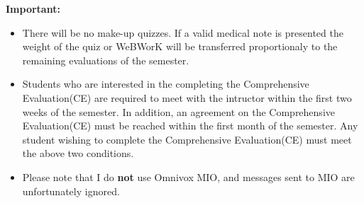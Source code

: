 \documentclass[12pt]{article}
\begin{document}
\textbf{Important:}
\begin{itemize}
\item There will be no make-up quizzes.  
If a valid medical note is presented the weight of the quiz or WeBWorK will be transferred proportionaly to the remaining evaluations of the semester.
\item Students who are interested in the completing the Comprehensive Evaluation(CE) are required to meet with the intructor 
within the first two weeks of the semester.  In addition, an agreement on the Comprehensive Evaluation(CE) must be reached within the 
first month of the semester.  Any student wishing to complete the Comprehensive Evaluation(CE) must meet the above two conditions.
\item Please note that I do \textbf{not} use Omnivox MIO, and messages sent to MIO are unfortunately ignored.
\end{itemize}
\end{document}
